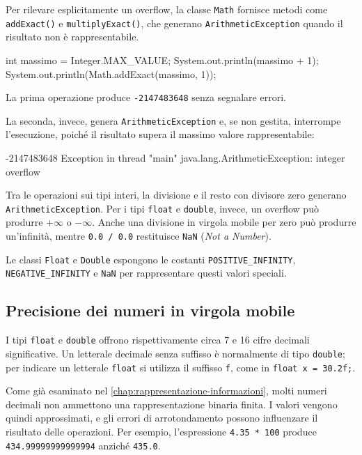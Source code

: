 Per rilevare esplicitamente un overflow, la classe
\texttt{Math} fornisce metodi come \texttt{addExact()}
e \texttt{multiplyExact()}, che generano
\texttt{ArithmeticException} quando il risultato
non è rappresentabile.

\begin{unipdcode}[language=Java]
int massimo = Integer.MAX_VALUE;
System.out.println(massimo + 1);
System.out.println(Math.addExact(massimo, 1));
\end{unipdcode}

La prima operazione produce \texttt{-2147483648} senza
segnalare errori. 

La seconda, invece, genera
\texttt{ArithmeticException} e, se non gestita, interrompe l'esecuzione,
poiché il risultato supera il massimo valore rappresentabile:

\begin{unipdterminal}
-2147483648
Exception in thread "main" java.lang.ArithmeticException: integer overflow
\end{unipdterminal}

Tra le operazioni sui tipi interi, la divisione e il resto
con divisore zero generano \texttt{ArithmeticException}.
Per i tipi \texttt{float} e \texttt{double}, invece,
un overflow può produrre \(+\infty\) o \(-\infty\).
Anche una divisione in virgola mobile per zero può produrre
un'infinità, mentre \texttt{0.0 / 0.0} restituisce
\texttt{NaN} (\emph{Not a Number}).

Le classi \texttt{Float} e \texttt{Double} espongono
le costanti \texttt{POSITIVE\_INFINITY},
\texttt{NEGATIVE\_INFINITY} e \texttt{NaN}
per rappresentare questi valori speciali.

\subsection{Precisione dei numeri in virgola mobile}
\label{sec:fi-java-precisione}

I tipi \texttt{float} e \texttt{double} offrono
rispettivamente circa 7 e 16 cifre decimali significative.
Un letterale decimale senza suffisso è normalmente di tipo
\texttt{double}; per indicare un letterale \texttt{float}
si utilizza il suffisso \texttt{f}, come in
\texttt{float x = 30.2f;}.

Come già esaminato nel
\cref{chap:rappresentazione-informazioni}, molti numeri
decimali non ammettono una rappresentazione binaria finita.
I valori vengono quindi approssimati, e gli errori di
arrotondamento possono influenzare il risultato delle
operazioni. Per esempio, l'espressione
\texttt{4.35 * 100} produce
\texttt{434.99999999999994} anziché \texttt{435.0}.


